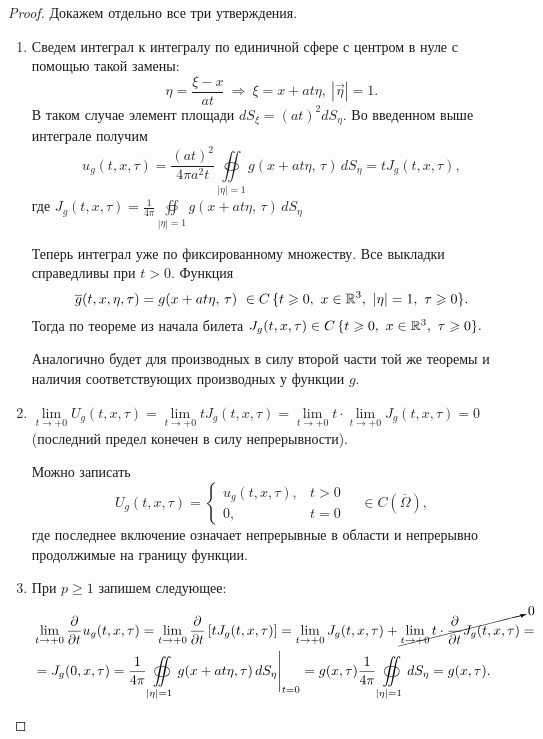 \documentclass[../main.tex]{subfiles}
\begin{document}
\begin{proof} Докажем отдельно все три утверждения.
\begin{enumerate}
\item Сведем интеграл к интегралу по единичной сфере с центром в нуле с помощью такой замены:
\[
\eta = \frac{\xi - x}{at} \ \Rightarrow\ \xi = x+at\eta,\ |\vec{\eta}|=1.
\]
В таком случае элемент площади $dS_{\xi}=(at)^2dS_{\eta}$. Во введенном выше интеграле получим 
\[
u_g(t,x,\tau)=\frac{(at)^2}{4\pi a^2t}\oiint\limits_{|\eta |=1}g(x+at\eta,\, \tau)\, dS_{\eta}=tJ_g(t,x,\tau ),
\]
где $\displaystyle J_g(t,x,\tau )= \frac{1}{4\pi}\oiint\limits_{|\eta |=1}g(x+at\eta,\, \tau)\, dS_{\eta}$

Теперь интеграл уже по фиксированному множеству. Все выкладки справедливы при $t>0$. Функция
\[
\overline{g}(t,x,\eta,\tau) = g(x+at\eta,\, \tau)\ \in C\,\{t\geq 0,\ x\in \R^3,\ |\eta | = 1,\ \tau\geq 0\}.
\]
Тогда по теореме из начала билета $J_g(t,x,\tau )\in C\,\{t\geq 0,\ x\in \R^3,\ \tau\geq 0\}.$

Аналогично будет для производных в силу второй части той же теоремы и наличия соответствующих производных у функции $g$.

\item $\lim\limits_{t\rightarrow +0}U_g(t,x,\tau )=\lim\limits_{t\rightarrow +0}tJ_g(t,x,\tau )=\lim\limits_{t\rightarrow +0}t\cdot\lim\limits_{t\rightarrow +0}J_g(t,x,\tau ) = 0$ (последний предел конечен в силу непрерывности).

Можно записать
\[
U_g(t,x,\tau ) = \begin{cases}
u_g(t,x, \tau ), &t>0\\
0, &t=0
\end{cases} \quad \in C\left(\overline{\Omega} \right),
\]
где последнее включение означает непрерывные в области и непрерывно продолжимые на границу функции.

\item При $p\geq 1$ запишем следующее:
\begin{equation*}
\begin{split}
&\lim\limits_{t\rightarrow +0}\frac{\partial}{\partial t} u_g(t,x, \tau) 
=\lim\limits_{t\rightarrow +0}\frac{\partial}{\partial t}\left[tJ_g(t,x,\tau )\right]
=\lim\limits_{t\rightarrow +0}J_g(t,x,\tau )+\cancelto{0}{\lim\limits_{t\rightarrow +0}t\cdot \frac{\partial}{\partial t}J_g(t,x,\tau )}=\\
&=J_g(0, x, \tau)
=\frac{1}{4\pi}\oiint\limits_{|\eta |=1}g(x+at\eta ,\tau)\, dS_{\eta }\Biggr|_{t=0}
=g(x, \tau )\frac{1}{4\pi}\oiint\limits_{|\eta |=1}dS_{\eta}=g(x,\tau ).
\end{split}
\end{equation*}
\end{enumerate}
\end{proof}
\end{document}
